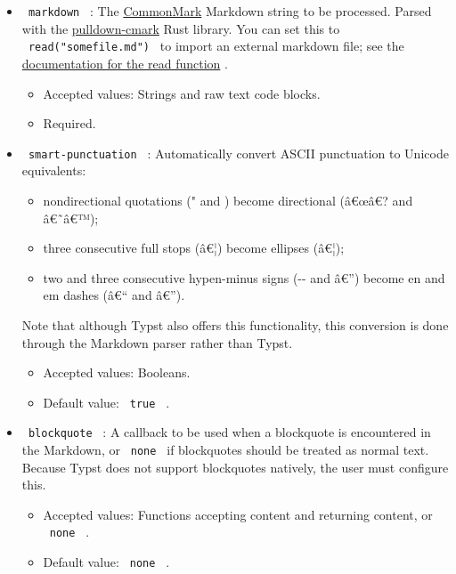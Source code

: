 \begin{itemize}
\item
  \texttt{\ markdown\ } : The
  \href{https://spec.commonmark.org/0.30/}{CommonMark} Markdown string
  to be processed. Parsed with the
  \href{https://docs.rs/pulldown-cmark}{pulldown-cmark} Rust library.
  You can set this to \texttt{\ read("somefile.md")\ } to import an
  external markdown file; see the
  \href{https://typst.app/docs/reference/data-loading/read/}{documentation
  for the read function} .

  \begin{itemize}
  \tightlist
  \item
    Accepted values: Strings and raw text code blocks.
  \item
    Required.
  \end{itemize}
\item
  \texttt{\ smart-punctuation\ } : Automatically convert ASCII
  punctuation to Unicode equivalents:

  \begin{itemize}
  \tightlist
  \item
    nondirectional quotations (" and \textquotesingle) become
    directional (â€œâ€? and â€˜â€™);
  \item
    three consecutive full stops (â€¦) become ellipses (â€¦);
  \item
    two and three consecutive hypen-minus signs (-\/- and â€'') become
    en and em dashes (â€`` and â€'').
  \end{itemize}

  Note that although Typst also offers this functionality, this
  conversion is done through the Markdown parser rather than Typst.

  \begin{itemize}
  \tightlist
  \item
    Accepted values: Booleans.
  \item
    Default value: \texttt{\ true\ } .
  \end{itemize}
\item
  \texttt{\ blockquote\ } : A callback to be used when a blockquote is
  encountered in the Markdown, or \texttt{\ none\ } if blockquotes
  should be treated as normal text. Because Typst does not support
  blockquotes natively, the user must configure this.

  \begin{itemize}
  \tightlist
  \item
    Accepted values: Functions accepting content and returning content,
    or \texttt{\ none\ } .
  \item
    Default value: \texttt{\ none\ } .
  \end{itemize}


\end{itemize}

